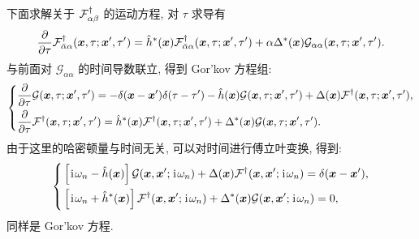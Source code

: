 下面求解关于 $\mathcal{F}_{\alpha\beta}^\dagger$ 的运动方程, 对 $\tau$ 求导有 
\begin{equation}
    \frac{\partial}{\partial\tau}\mathcal{F}_{\bar{\alpha}\alpha}^\dagger(\boldsymbol{x},\tau;\boldsymbol{x}',\tau')=\hat{h}^*(\boldsymbol{x})\mathcal{F}_{\bar{\alpha}\alpha}^\dagger(\boldsymbol{x},\tau;\boldsymbol{x}',\tau')+\alpha \Delta^*(\boldsymbol{x})\mathcal{G}_{\alpha\alpha}(\boldsymbol{x},\tau;\boldsymbol{x}',\tau').
\end{equation}
与前面对 $\mathcal{G}_{\alpha\alpha}$ 的时间导数联立, 得到 Gor'kov 方程组:
\begin{equation}
    \left\{
        \begin{aligned}
            &\frac{\partial}{\partial\tau}\mathcal{G}(\boldsymbol{x},\tau;\boldsymbol{x}',\tau')=-\delta(\boldsymbol{x}-\boldsymbol{x}')\delta(\tau-\tau')-\hat{h}(\boldsymbol{x})\mathcal{G}(\boldsymbol{x},\tau;\boldsymbol{x}',\tau')+\Delta(\boldsymbol{x})\mathcal{F}^\dagger(\boldsymbol{x},\tau;\boldsymbol{x}',\tau'),\\
            &\frac{\partial}{\partial\tau}\mathcal{F}^\dagger(\boldsymbol{x},\tau;\boldsymbol{x}',\tau')=\hat{h}^*(\boldsymbol{x})\mathcal{F}^\dagger(\boldsymbol{x},\tau;\boldsymbol{x}',\tau')+\Delta^*(\boldsymbol{x})\mathcal{G}(\boldsymbol{x},\tau;\boldsymbol{x}',\tau').
        \end{aligned}
    \right.
\end{equation}
由于这里的哈密顿量与时间无关, 可以对时间进行傅立叶变换, 得到:
\begin{equation}
    \left\{
    \begin{aligned}
        &\left[ \hspace{0.1em}\mathrm{i}\hspace{0.1em}\omega_n-\hat h(\boldsymbol{x}) \right]\mathcal{G}(\boldsymbol{x},\boldsymbol{x}';\hspace{0.1em}\mathrm{i}\hspace{0.1em}\omega_n)+\Delta(\boldsymbol{x})\mathcal{F}^\dagger (\boldsymbol{x},\boldsymbol{x}';\hspace{0.1em}\mathrm{i}\hspace{0.1em}\omega_n)=\delta(\boldsymbol{x}-\boldsymbol{x}'),\\
        &\left[ \hspace{0.1em}\mathrm{i}\hspace{0.1em}\omega_n+\hat h^*(\boldsymbol{x}) \right] \mathcal{F}^\dagger(\boldsymbol{x},\boldsymbol{x}';\hspace{0.1em}\mathrm{i}\hspace{0.1em}\omega_n)+\Delta^*(\boldsymbol{x})\mathcal{G}(\boldsymbol{x},\boldsymbol{x}';\hspace{0.1em}\mathrm{i}\hspace{0.1em}\omega_n)=0,
    \end{aligned}
    \right. 
\end{equation}
同样是 Gor'kov 方程.

